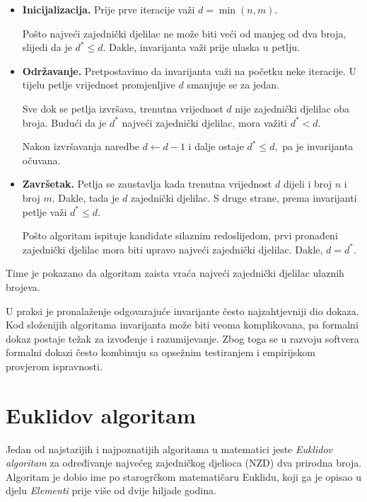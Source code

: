 \begin{itemize}
	\item \textbf{Inicijalizacija.} Prije prve iteracije važi $
	d=\min(n,m).
	$
	
	Pošto najveći zajednički djelilac ne može biti veći od manjeg od dva broja, slijedi da je 	$
	d^* \leq d.
	$   Dakle, invarijanta važi prije ulaska u petlju.
	
	\item \textbf{Održavanje.} Pretpostavimo da invarijanta važi na početku neke iteracije. U tijelu petlje vrijednost promjenljive $d$ smanjuje se za jedan.
	
	Sve dok se petlja izvršava, trenutna vrijednost $d$ nije zajednički djelilac oba broja. Budući da je $d^*$ najveći zajednički djelilac, mora važiti 	$
	d^* < d.
	$
	
	Nakon izvršavanja naredbe $d \gets d-1$ i dalje ostaje 	$
	d^* \leq d,
	$ pa je invarijanta očuvana.
	
	\item \textbf{Završetak.} Petlja se zaustavlja kada trenutna vrijednost $d$ dijeli i broj $n$ i broj $m$. Dakle, tada je $d$ zajednički djelilac. 	S druge strane, prema invarijanti petlje važi $
	d^* \leq d.
	$
	
	Pošto algoritam ispituje kandidate silaznim redoslijedom, prvi pronađeni zajednički djelilac mora biti upravo najveći zajednički djelilac. Dakle, 	$
	d=d^*.
	$
\end{itemize}

Time je pokazano da algoritam zaista vraća najveći zajednički djelilac ulaznih brojeva.


U praksi je pronalaženje odgovarajuće invarijante često najzahtjevniji dio dokaza. Kod složenijih algoritama invarijanta može biti veoma komplikovana, pa formalni dokaz postaje težak za izvođenje i razumijevanje. Zbog toga se u razvoju softvera formalni dokazi često kombinuju sa opsežnim testiranjem i empirijskom provjerom ispravnosti.

\section{Euklidov algoritam}

Jedan od najstarijih i najpoznatijih algoritama u matematici jeste \textit{Euklidov algoritam} za određivanje najvećeg zajedničkog djelioca (NZD) dva prirodna broja. Algoritam je dobio ime po starogrčkom matematičaru Euklidu, koji ga je opisao u djelu \textit{Elementi} prije više od dvije hiljade godina.

